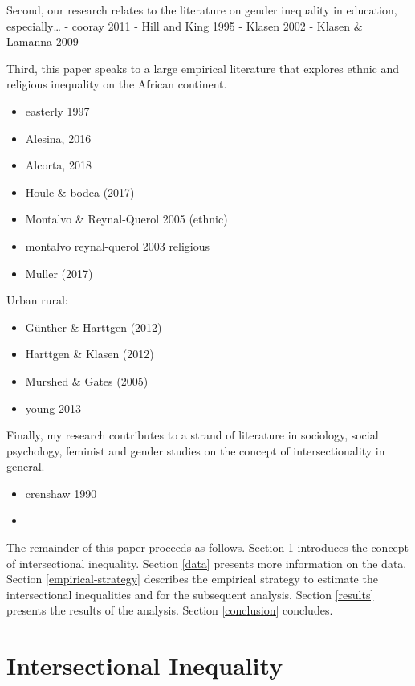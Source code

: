 \documentclass[
  11pt,
a4paper
]{article}
\providecommand{\tightlist}{%
  \setlength{\itemsep}{0pt}\setlength{\parskip}{0pt}}
\begin{document}
Second, our research relates to the literature on gender inequality in education, especially\ldots{}
- cooray 2011
- Hill and King 1995
- Klasen 2002
- Klasen \& Lamanna 2009

Third, this paper speaks to a large empirical literature that explores ethnic and religious inequality on the African continent.

\begin{itemize}
\tightlist
\item
  easterly 1997
\item
  Alesina, 2016
\item
  Alcorta, 2018
\item
  Houle \& bodea (2017)
\item
  Montalvo \& Reynal-Querol 2005 (ethnic)
\item
  montalvo reynal-querol 2003 religious
\item
  Muller (2017)
\end{itemize}

Urban rural:

\begin{itemize}
\tightlist
\item
  Günther \& Harttgen (2012)
\item
  Harttgen \& Klasen (2012)
\item
  Murshed \& Gates (2005)
\item
  young 2013
\end{itemize}

Finally, my research contributes to a strand of literature in sociology, social psychology, feminist and gender studies on the concept of intersectionality in general.

\begin{itemize}
\tightlist
\item
  crenshaw 1990
\item
\end{itemize}

The remainder of this paper proceeds as follows. Section \ref{intersectional-inequality} introduces the concept of intersectional inequality. Section \ref{data} presents more information on the data. Section \ref{empirical-strategy} describes the empirical strategy to estimate the intersectional inequalities and for the subsequent analysis. Section \ref{results} presents the results of the analysis. Section \ref{conclusion} concludes.

\hypertarget{intersectional-inequality}{%
\section{Intersectional Inequality}\label{intersectional-inequality}}
\end{document}
